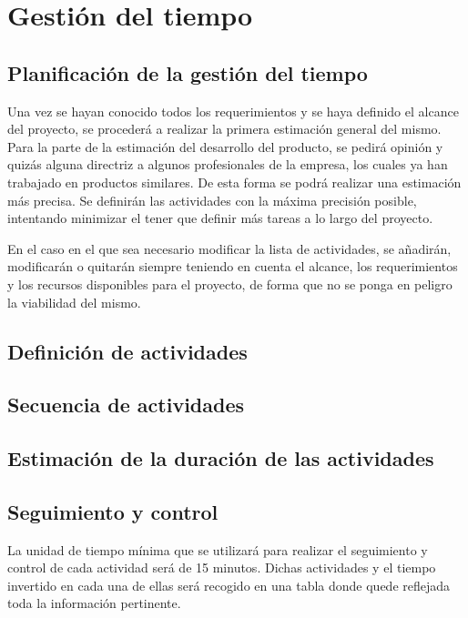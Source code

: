 \section{Gestión del tiempo}
\subsection{Planificación de la gestión del tiempo}
Una vez se hayan conocido todos los requerimientos y se haya definido el
alcance del proyecto, se procederá a realizar la primera estimación general
del mismo. Para la parte de la estimación del desarrollo del producto, se
pedirá opinión y quizás alguna directriz a algunos profesionales de la empresa,
los cuales ya han trabajado en productos similares. De esta forma se podrá
realizar una estimación más precisa. Se definirán las actividades con la
máxima precisión posible, intentando minimizar el tener que definir más tareas
a lo largo del proyecto.

En el caso en el que sea necesario modificar la lista de actividades, se
añadirán, modificarán o quitarán siempre teniendo en cuenta el alcance, los
requerimientos y los recursos disponibles para el proyecto, de forma que
no se ponga en peligro la viabilidad del mismo.


\subsection{Definición de actividades}

\subsection{Secuencia de actividades}

\subsection{Estimación de la duración de las actividades}

\subsection{Seguimiento y control}
La unidad de tiempo mínima que se utilizará para realizar el seguimiento y
control de cada actividad será de 15 minutos. Dichas actividades y el tiempo
invertido en cada una de ellas será recogido en una tabla donde quede reflejada
toda la información pertinente.
